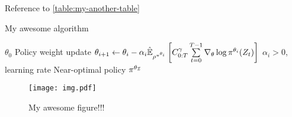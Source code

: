 \documentclass[12pt,twoside]{../../mitthesis}
\begin{document}
Reference to \ref{table:my-another-table}


\begin{algorithm}
\caption{My awesome algorithm}
\label{alg:my-alg}
\begin{algorithmic}
 $\theta_0$
    \STATE Policy weight update
    \STATE $\theta_{i+1} \la \theta_i - \alpha_i \Es[\trajpdf^{\policy^{\theta_i}}]{ \Cost^\gamma_{0:T} \sum \limits_{t=0}^{T-1} \nabla_\theta \log \policy^{\theta_i} ( \Traj_t ) }$
    \STATE $\alpha_i > 0$, learning rate
\ENDFOR
\STATE \RETURN Near-optimal policy $\policy^{\theta_{\mathcal I}}$
\end{algorithmic}
\end{algorithm}

\begin{figure}
    \caption{My awesome figure!!!}
    \label{fig:my-fig}
    \texttt{[image: img.pdf]}
\end{figure}

\printbibliography
%
%
\end{document}
